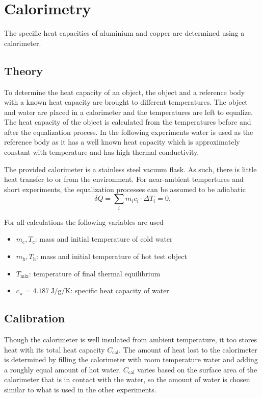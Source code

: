 \chapter{Calorimetry}
The specific heat capacities of aluminium and copper are determined using a calorimeter.

\section{Theory}\label{sec:cal-theory}
To determine the heat capacity of an object, the object and a reference body with a known heat capacity are brought to different temperatures.
The object and water are placed in a calorimeter and the temperatures are left to equalize.
The heat capacity of the object is calculated from the temperatures before and after the equalization process.
In the following experiments water is used as the reference body as it has a well known heat capacity which is approximately constant with temperature and has high thermal conductivity.

The provided calorimeter is a stainless steel vacuum flask.	%
As such, there is little heat transfer to or from the environment.
For near-ambient tempertures and short experiments, the equalization processes can be assumed to be adiabatic
\begin{equation}\label{eq:adiabatic}
	\delta Q = \sum_i m_i c_i \cdot \Delta T_i = 0.
\end{equation}

For all calculations the following variables are used
\begin{itemize}
	\item $m_\text{c}, T_\text{c}$: mass and initial temperature of cold water
	\item $m_\text{h}, T_\text{h}$: mass and initial temperature of hot test object
	\item $T_\text{mix}$: temperature of final thermal equilibrium
	\item $c_\text{w} = \SI{4.187}{\joule\per\gram\per\kelvin}$: specific heat capacity of water
\end{itemize}

\section{Calibration}
Though the calorimeter is well insulated from ambient temperature, it too stores heat with its total heat capacity $C_\text{cal}$.
The amount of heat lost to the calorimeter is determined by filling the calorimeter with room temperature water and adding a roughly equal amount of hot water.
$C_\text{cal}$ varies based on the surface area of the calorimeter that is in contact with the water, so the amount of water is chosen similar to what is used in the other experiments.


